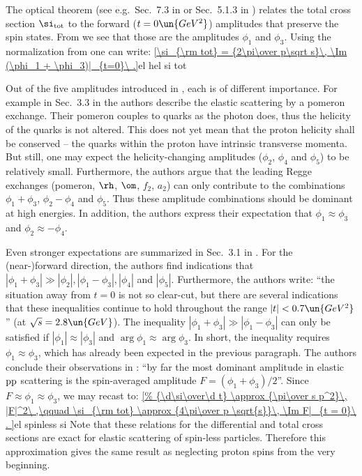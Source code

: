 The optical theorem (see e.g.~Sec.~7.3 in  or Sec.~5.1.3 in ) relates the total cross section $\si_{\rm tot}$ to the forward ($t=0\un{GeV^2}$) amplitudes that preserve the spin states. From  we see that those are the amplitudes $\phi_1$ and $\phi_3$. Using the normalization from  one can write:
\eqref{\si_{\rm tot} = {2\pi\over p\sqrt s}\, \Im (\phi_1 + \phi_3)|_{t=0}\ .}{el hel si tot}

Out of the five amplitudes introduced in , each is of different importance. For example in Sec.~3.3 in  the authors describe the elastic scattering by a pomeron exchange. Their pomeron couples to quarks as the photon does, thus the helicity of the quarks is not altered. This does not yet mean that the proton helicity shall be conserved -- the quarks within the proton have intrinsic transverse momenta. But still, one may expect the helicity-changing amplitudes ($\phi_2$, $\phi_4$ and $\phi_5$) to be relatively small. Furthermore, the authors argue that the leading Regge exchanges (pomeron, $\rm\rh$, $\rm\om$, $f_2$, $a_2$) can only contribute to the combinations $\phi_1+\phi_3$, $\phi_2 - \phi_4$ and $\phi_5$. Thus these amplitude combinations should be dominant at high energies. In addition, the authors express their expectation that $\phi_1 \approx \phi_3$ and $\phi_2 \approx - \phi_4$.

Even stronger expectations are summarized in Sec.~3.1 in . For the (near-)forward direction, the authors find indications that $|\phi_1 + \phi_3| \gg |\phi_2|, |\phi_1-\phi_3|, |\phi_4|$ and $|\phi_5|$. Furthermore, the authors write: ``the situation away from $t=0$ is not so clear-cut, but there are several indications that these inequalities continue to hold throughout the range $|t| < 0.7\un{GeV^2}$'' (at $\sqrt s = 2.8\un{GeV}$). The inequality $|\phi_1 + \phi_3| \gg |\phi_1-\phi_3|$ can only be satisfied if $|\phi_1| \approx |\phi_3|$ and $\arg\phi_1 \approx \arg\phi_3$. In short, the inequality requires $\phi_1 \approx \phi_3$, which has already been expected in the previous paragraph. The authors conclude their observations in : ``by far the most dominant amplitude in elastic $\rm pp$ scattering is the spin-averaged amplitude $F = (\phi_1+\phi_3)/2$''. Since $F\approx \phi_1 \approx \phi_3$, we may recast  to:
\eqref{%
	{\d\si\over\d t} \approx {\pi\over s p^2}\, |F|^2\ ,\qquad
	\si_{\rm tot} \approx {4\pi\over p \sqrt{s}}\, \Im F|_{t = 0}\ .
}{el spinless si}
Note that these relations for the differential and total cross sections are exact for elastic scattering of spin-less particles. Therefore this approximation gives the same result as neglecting proton spins from the very beginning.

